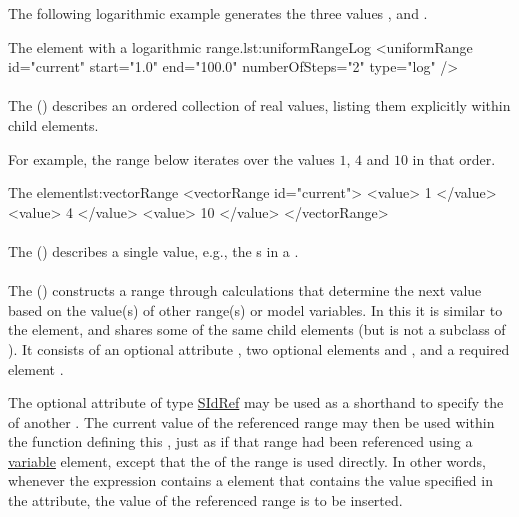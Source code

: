 The following logarithmic example generates the three values ,  and .
\begin{myXmlLst}{The  element with a logarithmic range.}{lst:uniformRangeLog}
<uniformRange id="current" start="1.0" end="100.0" numberOfSteps="2" type="log" />
\end{myXmlLst}

\paragraph{}
\label{class:vectorRange}

The  () describes an ordered collection of real values, listing them explicitly within child \hyperref[class:value]{} elements.

For example, the range below iterates over the values $1$, $4$ and $10$ in that order.
\begin{myXmlLst}{The  element}{lst:vectorRange}
<vectorRange id="current"> 
	<value> 1 </value> 
	<value> 4 </value> 
	<value> 10 </value> 
</vectorRange> 
\end{myXmlLst}

\paragraph{}
\label{class:value}
The  () describes a single value, e.g., the s in a \VectorRange.

\paragraph{}
\label{class:functionalRange}
The  () constructs a range through calculations that determine the next value based on the value(s) of other range(s) or model variables. In this it is similar to the \ComputeChange element, and shares some of the same child elements (but is not a subclass of \ComputeChange). It consists of an optional attribute , two optional elements \ListOfVariables and \ListOfParameters, and a required element \Math.

The optional attribute  of type \hyperref[type:sidref]{SIdRef} may be used as a shorthand to specify the \hyperref[sec:id]{} of another \Range. The current value of the referenced range may then be used within the function defining this , just as if that range had been referenced using a \hyperref[class:variable]{variable} element, except that the \hyperref[sec:id]{} of the range is used directly. In other words, whenever the expression contains a  element that contains the value specified in the  attribute, the value of the referenced range is to be inserted.

